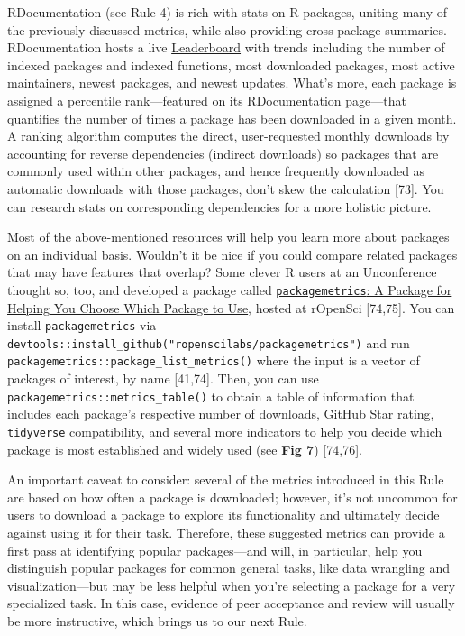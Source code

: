 \documentclass[10pt,letterpaper]{article}
\begin{document}
RDocumentation (see Rule 4) is rich with stats on R packages, uniting
many of the previously discussed metrics, while also providing
cross-package summaries. RDocumentation hosts a live
\href{https://www.rdocumentation.org/trends}{Leaderboard} with trends
including the number of indexed packages and indexed functions, most
downloaded packages, most active maintainers, newest packages, and
newest updates. What's more, each package is assigned a percentile
rank---featured on its RDocumentation page---that quantifies the number
of times a package has been downloaded in a given month. A ranking
algorithm computes the direct, user-requested monthly downloads by
accounting for reverse dependencies (indirect downloads) so packages
that are commonly used within other packages, and hence frequently
downloaded as automatic downloads with those packages, don't skew the
calculation {[}73{]}. You can research stats on corresponding
dependencies for a more holistic picture.

Most of the above-mentioned resources will help you learn more about
packages on an individual basis. Wouldn't it be nice if you could
compare related packages that may have features that overlap? Some
clever R users at an Unconference thought so, too, and developed a
package called
\href{https://docs.ropensci.org/packagemetrics/}{\texttt{packagemetrics}:
A Package for Helping You Choose Which Package to Use}, hosted at
rOpenSci {[}74,75{]}. You can install \texttt{packagemetrics} via
\texttt{devtools::install\_github("ropenscilabs/packagemetrics")} and
run \texttt{packagemetrics::package\_list\_metrics()} where the input is
a vector of packages of interest, by name {[}41,74{]}. Then, you can use
\texttt{packagemetrics::metrics\_table()} to obtain a table of
information that includes each package's respective number of downloads,
GitHub Star rating, \texttt{tidyverse} compatibility, and several more
indicators to help you decide which package is most established and
widely used (see \textbf{Fig 7}) {[}74,76{]}.

An important caveat to consider: several of the metrics introduced in
this Rule are based on how often a package is downloaded; however, it's
not uncommon for users to download a package to explore its
functionality and ultimately decide against using it for their task.
Therefore, these suggested metrics can provide a first pass at
identifying popular packages---and will, in particular, help you
distinguish popular packages for common general tasks, like data
wrangling and visualization---but may be less helpful when you're
selecting a package for a very specialized task. In this case, evidence
of peer acceptance and review will usually be more instructive, which
brings us to our next Rule.
\end{document}
